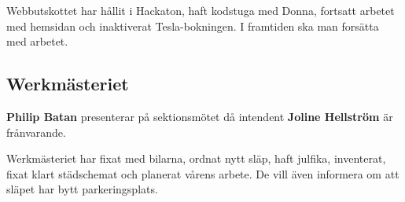 \documentclass[../protokoll-vintermote-2024.tex]{subfiles}
\begin{document}
Webbutskottet har hållit i Hackaton, haft kodstuga med Donna, fortsatt arbetet med hemsidan och inaktiverat Tesla-bokningen. I framtiden ska man forsätta med arbetet.

\subsection{Werkmästeriet}
\textbf{Philip Batan} presenterar på sektionsmötet då intendent \textbf{Joline Hellström} är frånvarande.

Werkmästeriet har fixat med bilarna, ordnat nytt släp, haft julfika, inventerat, fixat klart städschemat och planerat vårens arbete. De vill även informera om att släpet har bytt parkeringsplats.
\end{document}

